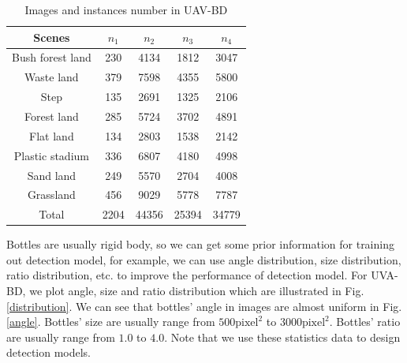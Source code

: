 \begin{table}
	\centering
	\small
	\caption{Images and instances number in UAV-BD}
	\label{statistics}
	\begin{tabular}{@{}ccc|cc@{}}
		\toprule
		Scenes     & $n_1$& $n_2$ & $n_3$ & $n_4$  \\ \midrule
		Bush forest land       & 230  & 4134  & 1812  & 3047  \\
		Waste land     & 379  & 7598  & 4355  & 5800  \\
		Step       & 135  & 2691  & 1325  & 2106  \\
		Forest land    & 285  & 5724  & 3702  & 4891  \\
		Flat land       & 134  & 2803  & 1538  & 2142  \\
		Plastic stadium & 336  & 6807  & 4180  & 4998  \\
		Sand land       & 249  & 5570  & 2704  & 4008  \\
		Grassland       & 456  & 9029  & 5778  & 7787  \\ \midrule
		Total      & 2204 & 44356 & 25394 & 34779 \\ \bottomrule
	\end{tabular}
\end{table}


Bottles are usually rigid body, so we can get some prior information for training out detection model, for example, we can use angle distribution, size distribution, ratio distribution, etc. to improve the performance of detection model. For UVA-BD, we plot angle, size and ratio distribution which are illustrated in Fig.\ref{distribution}. We can see that bottles' angle in images are almost uniform in Fig.\ref{angle}. Bottles' size are usually range from $500\text{pixel}^2 $ to $3000\text{pixel}^2 $. Bottles' ratio are usually range from $ 1.0 $ to $ 4.0 $. Note that we use these statistics data to design detection models.


